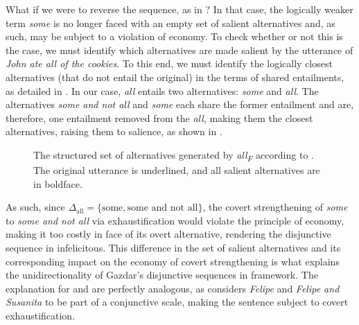 What if we were to reverse the sequence, as in ? In that case, the logically weaker term \textit{some} is no longer faced with an empty set of salient alternatives and, as such, may be subject to a violation of economy. To check whether or not this is the case, we must identify which alternatives are made salient by the utterance of \textit{John ate all of the cookies}. To this end, we must identify the logically closest alternatives (that do not entail the original) in the terms of shared entailments, as detailed in . In our case, \textit{all} entails two alternatives: \textit{some} and \textit{all}. The alternatives \textit{some and not all} and \textit{some} each share the former entailment and are, therefore, one entailment removed from the \textit{all}, making them the closest alternatives, raising them to salience, as shown in .
\begin{figure}[!htb]
    \centering\hspace{-6cm}
    
    \caption{The structured set of alternatives generated by \textit{all\textsubscript{F}} according to \textcite{Ippolito2020}. The original utterance is underlined, and all salient alternatives are in boldface.}
\end{figure}

\noindent As such, since $\Delta_\text{all}=\{\text{some},\text{some and not all}\}$, the covert strengthening of \textit{some} to \textit{some and not all} via exhaustification would violate the principle of economy, making it too costly in face of its overt alternative, rendering the disjunctive sequence in  infelicitous. This difference in the set of salient alternatives and its corresponding impact on the economy of covert strengthening is what explains the unidirectionality of Gazdar's disjunctive sequences in  framework. The explanation for  and  are perfectly analogous, as \textcite{Ippolito2020} considers \textit{Felipe} and \textit{Felipe and Susanita} to be part of a conjunctive scale, making the sentence subject to covert exhaustification.


